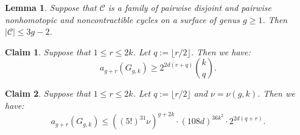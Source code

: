 \documentclass[10pt,a4paper]{amsart}
\newtheorem{lemma}{Lemma}
\newtheorem{claim}{Claim}
\newcommand\C{\mathcal C}
\begin{document}
\begin{lemma}\label{lem:disjoint nonhomotopic}
  Suppose that $\C$ is a family of pairwise disjoint and pairwise nonhomotopic and noncontractible cycles on a surface of genus $g\ge1$. Then $|\C|\le 3g-2$.
\end{lemma}

  \begin{claim}\label{cl:lower bound}
     Suppose that $1\le r\le 2k$. Let $q:=\lfloor r/2\rfloor$. Then we have:
     $$
        a_{g+r}(G_{g,k}) \ge 2^{2d(r+q)}\binom{k}{q}.
     $$
  \end{claim}

  \begin{claim}\label{cl:upper bound}
     Suppose that $1\le r\le 2k$. Let $q:=\lfloor r/2\rfloor$ and $\nu=\nu(g,k)$. Then we have:
     $$
        a_{g+r}(G_{g,k}) \le \left((5!)^{31} \nu\right)^{g+2k} \cdot \left( 108d \right)^{36k^2} \cdot 2^{2d(q+r)} .
     $$
  \end{claim}
\end{document}
